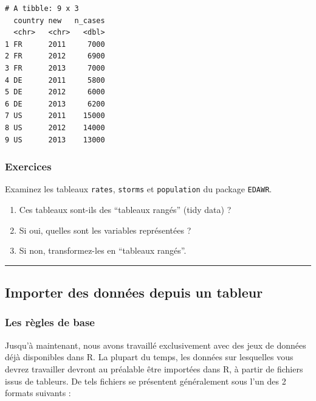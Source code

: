 \documentclass[
  a4paper,
]{article}
\providecommand{\tightlist}{%
  \setlength{\itemsep}{0pt}\setlength{\parskip}{0pt}}
\begin{document}
\begin{verbatim}
# A tibble: 9 x 3
  country new   n_cases
  <chr>   <chr>   <dbl>
1 FR      2011     7000
2 FR      2012     6900
3 FR      2013     7000
4 DE      2011     5800
5 DE      2012     6000
6 DE      2013     6200
7 US      2011    15000
8 US      2012    14000
9 US      2013    13000
\end{verbatim}

\hypertarget{exercices-7}{%
\subsubsection{Exercices}\label{exercices-7}}

Examinez les tableaux \texttt{rates}, \texttt{storms} et \texttt{population} du package \texttt{EDAWR}.

\begin{enumerate}
\def\labelenumi{\arabic{enumi}.}
\tightlist
\item
  Ces tableaux sont-ils des ``tableaux rangés'' (tidy data) ?
\item
  Si oui, quelles sont les variables représentées ?
\item
  Si non, transformez-les en ``tableaux rangés''.
\end{enumerate}

\begin{center}\rule{0.5\linewidth}{0.5pt}\end{center}

\hypertarget{importer-des-donnuxe9es-depuis-un-tableur}{%
\subsection{Importer des données depuis un tableur}\label{importer-des-donnuxe9es-depuis-un-tableur}}

\hypertarget{les-ruxe8gles-de-base}{%
\subsubsection{Les règles de base}\label{les-ruxe8gles-de-base}}

Jusqu'à maintenant, nous avons travaillé exclusivement avec des jeux de données déjà disponibles dans R. La plupart du temps, les données sur lesquelles vous devrez travailler devront au préalable être importées dans R, à partir de fichiers issus de tableurs. De tels fichiers se présentent généralement sous l'un des 2 formats suivants :
\end{document}
